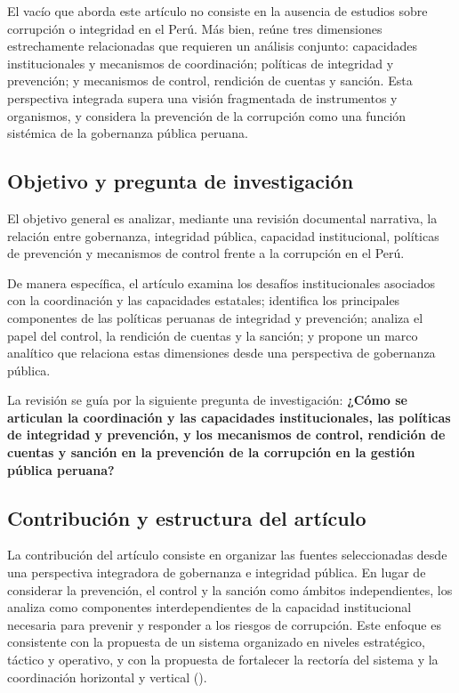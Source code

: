 \documentclass[Afour,sageh,times]{sagej}
\begin{document}
El vacío que aborda este artículo no consiste en la ausencia de estudios sobre corrupción o integridad en el Perú. Más bien, reúne tres dimensiones estrechamente relacionadas que requieren un análisis conjunto: capacidades institucionales y mecanismos de coordinación; políticas de integridad y prevención; y mecanismos de control, rendición de cuentas y sanción. Esta perspectiva integrada supera una visión fragmentada de instrumentos y organismos, y considera la prevención de la corrupción como una función sistémica de la gobernanza pública peruana.

\subsection{Objetivo y pregunta de investigación}
El objetivo general es analizar, mediante una revisión documental narrativa, la relación entre gobernanza, integridad pública, capacidad institucional, políticas de prevención y mecanismos de control frente a la corrupción en el Perú.

De manera específica, el artículo examina los desafíos institucionales asociados con la coordinación y las capacidades estatales; identifica los principales componentes de las políticas peruanas de integridad y prevención; analiza el papel del control, la rendición de cuentas y la sanción; y propone un marco analítico que relaciona estas dimensiones desde una perspectiva de gobernanza pública.

La revisión se guía por la siguiente pregunta de investigación: \textbf{¿Cómo se articulan la coordinación y las capacidades institucionales, las políticas de integridad y prevención, y los mecanismos de control, rendición de cuentas y sanción en la prevención de la corrupción en la gestión pública peruana?}

\subsection{Contribución y estructura del artículo}
La contribución del artículo consiste en organizar las fuentes seleccionadas desde una perspectiva integradora de gobernanza e integridad pública. En lugar de considerar la prevención, el control y la sanción como ámbitos independientes, los analiza como componentes interdependientes de la capacidad institucional necesaria para prevenir y responder a los riesgos de corrupción. Este enfoque es consistente con la propuesta de un sistema organizado en niveles estratégico, táctico y operativo, y con la propuesta de fortalecer la rectoría del sistema y la coordinación horizontal y vertical (\citealp{munive2022integridad,oecd2024sistema}).
\end{document}
